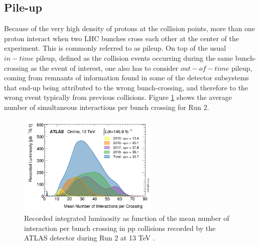 \subsection{Pile-up}
\label{chap2:LHC:PU}
Because of the very high density of protons at the collision points, more than one proton interact when two LHC bunches cross each other at the center of the experiment. This is commonly referred to as pileup. On top of the usual $in-time$ pileup, defined as the collision events occurring during the same bunch-crossing as the event of interest, one also has to consider $out-of-time$ pileup, coming from remnants of information found in some of the detector subsystems that end-up being attributed to the wrong bunch-crossing, and therefore to the wrong event typically from previous collisions. Figure \ref{fig:chap2:LHC:PU} shows the average number of simultaneous interactions per bunch crossing for Run 2. \\
\begin{figure}[htbp]
    \centering
    \includegraphics[width=0.6\textwidth]{Ch2/Img/PU.png}
    \caption{Recorded integrated luminosity as function of the mean number of interaction per bunch crossing in pp collisions recorded by the ATLAS detector during Run 2 at 13 TeV \cite{Lumi2018}.}
    \label{fig:chap2:LHC:PU}
\end{figure}

